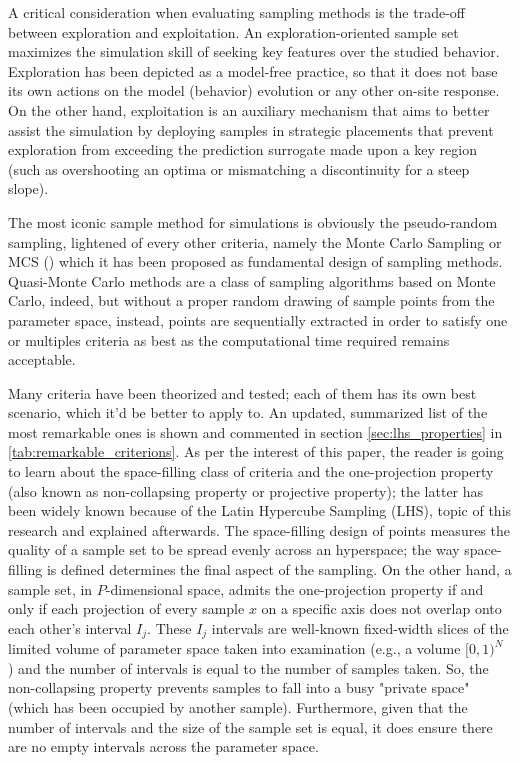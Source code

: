 \documentclass[12pt]{article}
\begin{document}
A critical consideration when evaluating sampling methods is the trade-off between exploration and exploitation. An exploration-oriented sample set maximizes the simulation skill of seeking key features over the studied behavior. Exploration has been depicted as a model-free practice, so that it does not base its own actions on the model (behavior) evolution or any other on-site response. On the other hand, exploitation is an auxiliary mechanism that aims to better assist the simulation by deploying samples in strategic placements that prevent exploration from exceeding the prediction surrogate made upon a key region (such as overshooting an optima or mismatching a discontinuity for a steep slope).

The most iconic sample method for simulations is obviously the pseudo-random sampling, lightened of every other criteria, namely the Monte Carlo Sampling or MCS ()  which it has been proposed as fundamental design of sampling methods. Quasi-Monte Carlo methods are a class of sampling algorithms based on Monte Carlo, indeed, but without a proper random drawing of sample points from the parameter space, instead, points are sequentially extracted in order to satisfy one or multiples criteria as best as the computational time required remains acceptable.
 
Many criteria have been theorized and tested; each of them has its own best scenario, which it'd be better to apply to. An updated, summarized list of the most remarkable ones is shown and commented in section \cref{sec:lhs_properties} in \cref{tab:remarkable_criterions}. As per the interest of this paper, the reader is going to learn about the space-filling class of criteria and the one-projection property (also known as non-collapsing property or projective property); the latter has been widely known because of the Latin Hypercube Sampling (LHS), topic of this research and explained afterwards. The space-filling design of points measures the quality of a sample set to be spread evenly across an hyperspace; the way space-filling is defined determines the final aspect of the sampling. On the other hand, a sample set, in $P$-dimensional space, admits the one-projection property if and only if each projection of every sample $x$ on a specific axis does not overlap onto each other's interval $I_j$. These $I_j$ intervals are well-known fixed-width slices of the limited volume of parameter space taken into examination (e.g., a volume $[0,1)^N$ ) and the number of intervals is equal to the number of samples taken. So, the non-collapsing property prevents samples to fall into a busy "private space" (which has been occupied by another sample). Furthermore, given that the number of intervals and the size of the sample set is equal, it does ensure there are no empty intervals across the parameter space.
\end{document}
